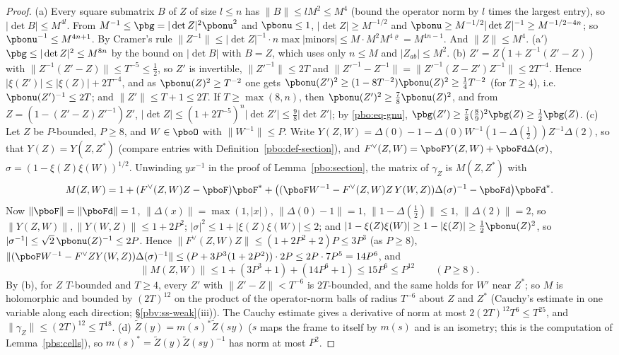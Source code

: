 \documentclass[10pt]{amsart}
\theoremstyle{definition}
\theoremstyle{remark}
\begin{document}
\begin{proof}
(a) Every square submatrix $B$ of $Z$ of size $l\le n$ has $\|B\|\le lM^2\le M^4$ (bound the operator
norm by $l$ times the largest entry), so $|\det B|\le M^{4l}$. From $M^{-1}\le\pbg=|\det Z|^2\pbonu^2$
and $\pbonu\le1$, $|\det Z|\ge M^{-1/2}$ and $\pbonu\ge M^{-1/2}|\det Z|^{-1}\ge M^{-1/2-4n}$; so
$\pbonu^{-1}\le M^{4n+1}$. By Cramer's rule $\|Z^{-1}\|\le|\det Z|^{-1}\cdot n\max|\text{minors}|\le
M\cdot M^2M^{4\varrho}=M^{4n-1}$. And $\|Z\|\le M^4$. (a$'$) $\pbg\le|\det Z|^2\le M^{8n}$ by the bound on $|\det B|$ with $B=Z$,
which uses only $n\le M$ and $|Z_{ab}|\le M^2$. (b) $Z'=Z(1+Z^{-1}
(Z'-Z))$ with $\|Z^{-1}(Z'-Z)\|\le T^{-5}\le\frac12$, so $Z'$ is invertible, $\|Z'^{-1}\|\le2T$ and
$\|Z'^{-1}-Z^{-1}\|=\|Z'^{-1}(Z-Z')Z^{-1}\|\le2T^{-4}$. Hence $|\xi(Z')|\le|\xi(Z)|+2T^{-4}$, and as
$\pbonu(Z)^2\ge T^{-2}$ one gets $\pbonu(Z')^2\ge(1-8T^{-2})\pbonu(Z)^2\ge\frac14T^{-2}$ (for $T\ge4$),
i.e.\ $\pbonu(Z')^{-1}\le2T$; and $\|Z'\|\le T+1\le2T$. If $T\ge\max(8,n)$, then $\pbonu(Z')^2\ge\frac78
\pbonu(Z)^2$, and from $Z=(1-(Z'-Z)Z'^{-1})Z'$, $|\det Z|\le(1+2T^{-5})^n|\det Z'|\le\frac98|\det Z'|$;
by \eqref{pbo:eq-gnu}, $\pbg(Z')\ge\frac78(\frac89)^2\pbg(Z)\ge\frac12\pbg(Z)$. (c) Let $Z$ be $P$-bounded,
$P\ge8$, and $W\in\pboO$ with $\|W^{-1}\|\le P$. Write $Y(Z,W)=\Delta(0)-1-\Delta(0)W^{-1}(1-\Delta(\frac12))
Z^{-1}\Delta(2)$, so that $Y(Z)=Y(Z,Z^*)$ (compare entries with Definition~\ref{pbo:def-section}), and
$F^\vee(Z,W)=\pboF Y(Z,W)+\pboFd\Delta(\sigma)$, $\sigma=(1-\xi(Z)\xi(W))^{1/2}$. Unwinding $yx^{-1}$ in the proof of
Lemma~\ref{pbo:section}, the matrix of $\gamma_Z$ is $M(Z,Z^*)$ with
\[
M(Z,W)=1+(F^\vee(Z,W)Z-\pboF)\pboF^*+\bigl((\pboF W^{-1}-F^\vee(Z,W)Z\,Y(W,Z))\Delta(\sigma)^{-1}-\pboFd\bigr)\pboFd^* .
\]
Now $\|\pboF\|=\|\pboFd\|=1$, $\|\Delta(x)\|=\max(1,|x|)$, $\|\Delta(0)-1\|=1$, $\|1-\Delta(\frac12)\|\le1$, $\|\Delta(2)\|=2$, so
$\|Y(Z,W)\|,\|Y(W,Z)\|\le1+2P^2$; $|\sigma|^2\le1+|\xi(Z)\xi(W)|\le2$; and $|1-\xi(Z)\xi(W)|\ge1-|\xi(Z)|\ge\frac12\pbonu(Z)^2$,
so $|\sigma^{-1}|\le\sqrt2\,\pbonu(Z)^{-1}\le2P$. Hence $\|F^\vee(Z,W)Z\|\le(1+2P^2+2)P\le3P^3$ (as $P\ge8$),
$\|(\pboF W^{-1}-F^\vee ZY(W,Z))\Delta(\sigma)^{-1}\|\le(P+3P^3(1+2P^2))\cdot2P\le2P\cdot7P^5=14P^6$, and
\[
\|M(Z,W)\|\le1+(3P^3+1)+(14P^6+1)\le15P^6\le P^{12}\qquad(P\ge8).
\] By (b), for $Z$ $T$-bounded and $T\ge4$,
every $Z'$ with $\|Z'-Z\|<T^{-6}$ is $2T$-bounded, and the same holds for $W'$ near $Z^*$; so $M$ is
holomorphic and bounded by $(2T)^{12}$ on the product of the operator-norm balls of radius $T^{-6}$ about $Z$ and $Z^*$ (Cauchy's estimate in one variable along each direction; \S\ref{pbv:ss-weak}(iii)). The Cauchy
estimate gives a derivative of norm at most $2(2T)^{12}T^6\le T^{25}$, and $\|\gamma_Z\|\le(2T)^{12}\le
T^{18}$. (d) $\tilde Z(y)=m(s)^*\tilde Z(sy)$ ($s$ maps the frame to itself by $m(s)$ and is an
isometry; this is the computation of Lemma~\ref{pbs:cells}), so $m(s)^*=\tilde Z(y)\tilde Z(sy)^{-1}$
has norm at most $P^2$.
\end{proof}
\end{document}
